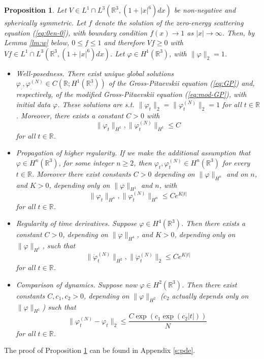 \documentclass[11pt,a4paper]{article}
\newtheorem{proposition}[thm]{Proposition}
\newcommand{\bR}{{\mathbb R}}
\begin{document}
\begin{proposition} \label{t:pdes}
Let $V \in L^1 \cap L^3 (\bR^3, (1+|x|^6) dx)$ be non-negative and spherically symmetric. Let $f$ denote the solution of the zero-energy scattering equation (\ref{eq:0en-0}), with boundary condition $f(x) \to 1$ as $|x| \to \infty$. Then, by Lemma \ref{lm:w} below, $0 \leq f \leq 1$ and therefore $Vf \geq 0$ with $Vf \in L^1 \cap L^3 (\bR^3, (1+|x|^6) dx)$. Let $\varphi \in H^1 (\bR^3)$, with 
$\| \varphi \|_2 = 1$.
\begin{itemize}
\item[(i)] Well-posedness. There exist unique global solutions $\varphi_. , \varphi_.^{(N)} \in C(\bR ; H^1 (\bR^3))$ of the Gross-Pitaevskii equation (\ref{eq:GP}) and, respectively, of the modified Gross-Pitaevskii equation (\ref{eq:mod-GP}), with initial data $\varphi$. These solutions are s.t. $\| \varphi_t \|_2 = \| \varphi_t^{(N)} \|_2 = 1$ for all $t \in \bR$. Moreover, there exists a constant $C > 0$ with 
\[  \| \varphi_t \|_{H^1} , \| \varphi_t^{(N)} \|_{H^1} \leq C \]
for all $t \in \bR$. 
\item[(ii)] Propagation of higher regularity. If we make the additional assumption that $\varphi \in H^n (\bR^3)$, for some integer $n \geq 2$, then $\varphi_t , \varphi_t^{(N)} \in H^n (\bR^3)$ for every $t \in \bR$. Moreover there exist constants $C>0$ depending on $\| \varphi \|_{H^n}$ and on $n$, and $K >0$, depending only on $\| \varphi \|_{H^1}$ and $n$, with
\begin{equation}\label{eq:hireg} \| \varphi_t \|_{H^n} , \| \varphi_t^{(N)} \|_{H^n} \leq C e^{K |t|} \end{equation}
for all $t \in \bR$. 
\item[(iii)] Regularity of time derivatives. Suppose $\varphi \in H^4 (\bR^3)$. Then there exists a constant $C>0$, depending on $\| \varphi \|_{H^4}$,  and $K > 0$, depending only on $\| \varphi \|_{H^1}$, such that
\[   \|\dot{\varphi}_t^{(N)} \|_{H^2} , \| \ddot{\varphi}_t^{(N)} \|_2 \leq C e^{K |t|} \]
for all $t \in \bR$.
\item[(iv)] Comparison of dynamics. Suppose now $\varphi \in H^2 (\bR^3)$. Then there exist constants $C,c_1,c_2 > 0$, depending on $\| \varphi \|_{H^2}$ ($c_2$ actually depends only on $\| \varphi \|_{H^1}$) such that 
\[ \| \varphi_t^{(N)} - \varphi_t \|_2 \leq \frac{C \exp (c_1 \exp (c_2 |t|))}{N} \,  \]
for all $t \in \bR$.
\end{itemize}
\end{proposition} 
The proof of Proposition \ref{t:pdes} can be found in Appendix \ref{s:pde}. 
\end{document}
